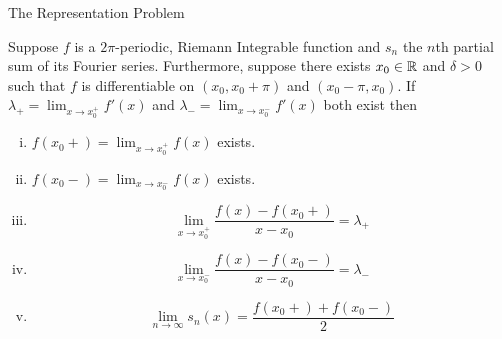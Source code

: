 \begin{section}{The Representation Problem}
\begin{thrm}[Jordan]\label{thrm:Jordan}
	Suppose $f$ is a $2\pi$-periodic, Riemann Integrable
	function and $s_n$ the $n$th partial sum of its
	Fourier series. Furthermore, suppose there exists
	$x_0 \in \mathbb{R}$ and $\delta > 0$ such that $f$ is
	differentiable on $(x_0,x_0+\pi)$ and $(x_0-\pi,x_0)$.
	If $\lambda_+ = \lim_{x \rightarrow x_0^+}f'(x)$ and
	$\lambda_- = \lim_{x \rightarrow x_0^-}f'(x)$ both
	exist then
		\begin{enumerate}[i)]
			\item
				$f(x_0+) = \lim_{x \rightarrow x_0^+}f(x)$
				exists.
			\item
				$f(x_0-) = \lim_{x \rightarrow x_0^-}f(x)$
				exists.
			\item
				\begin{displaymath}
					\lim_{x \rightarrow x_0^+}\frac{f(x)-f(x_0+)}
						{x-x_0} = \lambda_+
				\end{displaymath}
			\item
				\begin{displaymath}
					\lim_{x \rightarrow x_0^-}\frac{f(x)-f(x_0-)}
						{x-x_0} = \lambda_-
				\end{displaymath}
			\item
				\begin{displaymath}
					\lim_{n \rightarrow \infty}s_n(x)
						= \frac{f(x_0+)+f(x_0-)}{2}
				\end{displaymath}
		\end{enumerate}
\end{thrm}


\end{section}
